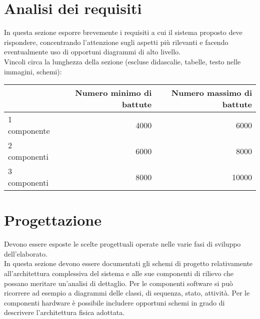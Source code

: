 \documentclass[12pt]{article}
\begin{document}
\newpage



\section{Analisi dei requisiti}

In questa sezione esporre brevemente i requisiti a cui il sistema proposto deve rispondere, concentrando l'attenzione sugli aspetti più rilevanti e facendo eventualmente uso di opportuni diagrammi di alto livello.\\

Vincoli circa la lunghezza della sezione (escluse didascalie, tabelle, testo nelle immagini, schemi):

\vspace{1cm}
\begin{tabular}{l|rr}
 & Numero minimo di battute & Numero massimo di battute \\
 \hline
 1 componente & 4000 & 6000 \\
 2 componenti & 6000 & 8000 \\
 3 componenti & 8000 & 10000 \\
 \hline
\end{tabular}


\newpage



\section{Progettazione}

Devono essere esposte le scelte progettuali operate nelle varie fasi di sviluppo dell'elaborato.\\

In questa sezione devono essere documentati gli schemi di progetto relativamente all'architettura complessiva del sistema e alle sue componenti di rilievo che possano meritare un'analisi di dettaglio. Per le componenti software si può ricorrere ad esempio a diagrammi delle classi, di sequenza, stato, attività. Per le componenti hardware è possibile includere opportuni schemi in grado di descrivere l'architettura fisica adottata.\\
\end{document}
